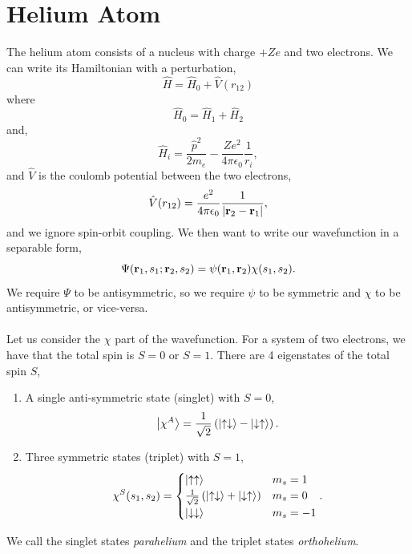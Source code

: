 \documentclass{book}
\begin{document}
\section{Helium Atom}
The helium atom consists of a nucleus with charge $+Ze$ and two electrons. We can write its Hamiltonian with a perturbation,
\begin{equation}
	\hat{H} = \hat{H}_0 + \hat{V}(r_{12})
\end{equation}
where
\begin{equation}
	\hat{H}_0 = \hat{H}_1 + \hat{H}_2
\end{equation}
and,
\begin{equation}
	\hat{H}_i = \frac{\hat{p}^2}{2m_e} - \frac{Ze^2}{4\pi\epsilon_0}\frac{1}{r_i},
\end{equation}
and $\hat{V}$ is the coulomb potential between the two electrons,
\begin{equation}
	\hat{V}(r_{12}) = \frac{e^2}{4\pi\epsilon_0}\frac{1}{\abs{\vb{r}_2 - \vb{r}_1}},
\end{equation}
and we ignore spin-orbit coupling. We then want to write our wavefunction in a separable form,
\begin{equation}
	\Psi(\vb{r}_1,s_1;\vb{r}_2,s_2) = \psi(\vb{r}_1,\vb{r}_2)\chi(s_1,s_2).
\end{equation}
We require $\Psi$ to be antisymmetric, so we require $\psi$ to be symmetric and $\chi$ to be antisymmetric, or vice-versa.
\\\\
Let us consider the $\chi$ part of the wavefunction. For a system of two electrons, we have that the total spin is $S = 0$ or $S = 1$. There are 4 eigenstates of the total spin $S$,
\begin{enumerate}
	\item A single anti-symmetric state (singlet) with $S = 0$,
	\begin{equation}
		\ket{\chi^A} = \frac{1}{\sqrt{2}}\left(\ket{\uparrow\downarrow} - \ket{\downarrow\uparrow}\right).
	\end{equation}
	\item Three symmetric states (triplet) with $S = 1$,
	\begin{align}
		\chi^S(s_1,s_2) = \begin{cases}
			\ket{\uparrow\uparrow} & m_s = 1 \\
			\frac{1}{\sqrt{2}}\left(\ket{\uparrow\downarrow} + \ket{\downarrow\uparrow}\right) & m_s = 0 \\
			\ket{\downarrow\downarrow} & m_s = -1
		\end{cases}.
	\end{align}
\end{enumerate}
We call the singlet states \textit{parahelium} and the triplet states \textit{orthohelium}.
\end{document}

